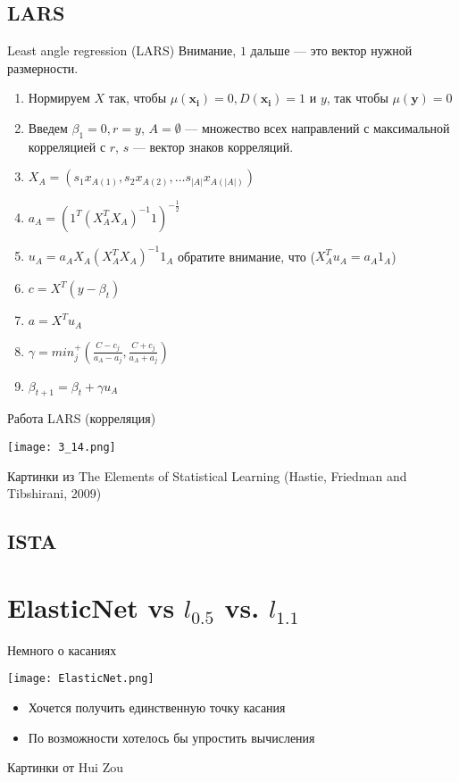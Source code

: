 \documentclass[14pt, fleqn, xcolor={dvipsnames, table}]{beamer}
\begin{document}
\subsection{LARS}
\begin{frame}{Least angle regression (LARS)}
\small
Внимание, $1$ дальше --- это вектор нужной размерности.
\footnotesize
\begin{enumerate}
  \item Нормируем $X$ так, чтобы $\mu(\mathbf{x_i}) = 0, D(\mathbf{x_i}) = 1$ и $y$, так чтобы $\mu(\mathbf{y}) = 0$
  \item Введем $\beta_1 = 0, r = y$, $A = \emptyset$ --- множество всех направлений с максимальной корреляцией с $r$, $s$ --- вектор знаков корреляций.
  \item $X_A = \left(s_1x_{A(1)}, s_2x_{A(2)}, \ldots s_{|A|}x_{A(|A|)}\right)$
  \item $a_A = \left(1^T (X_A^TX_A)^{-1}1\right)^{-\frac{1}{2}}$
  \item $u_A = a_AX_A(X_A^TX_A)^{-1}1_A$ обратите внимание, что ($X_A^Tu_A = a_A 1_A$)
  \item $c = X^T (y - \beta_t)$
  \item $a = X^T u_A$
  \item $\gamma = min^+_j \left(\frac{C - c_j}{a_A - a_j}, \frac{C + c_j}{a_A + a_j}\right)$
  \item $\beta_{t+1} = \beta_t + \gamma u_A$
\end{enumerate}
\end{frame}

\begin{frame}{Работа LARS (корреляция)}
\begin{center}
\texttt{[image: 3\_14.png]} 
\end{center}
\footnotesize
Картинки из The Elements of Statistical Learning (Hastie, Friedman and Tibshirani, 2009)
\end{frame}

\subsection{ISTA}

\section{ElasticNet vs $l_{0.5}$ vs. $l_{1.1}$}
\begin{frame}{Немного о касаниях}
\begin{center}
\texttt{[image: ElasticNet.png]} 
\end{center}
\footnotesize
\begin{itemize}
  \item Хочется получить единственную точку касания
  \item По возможности хотелось бы упростить вычисления
\end{itemize}
Картинки от Hui Zou
\end{frame}
\end{document}
